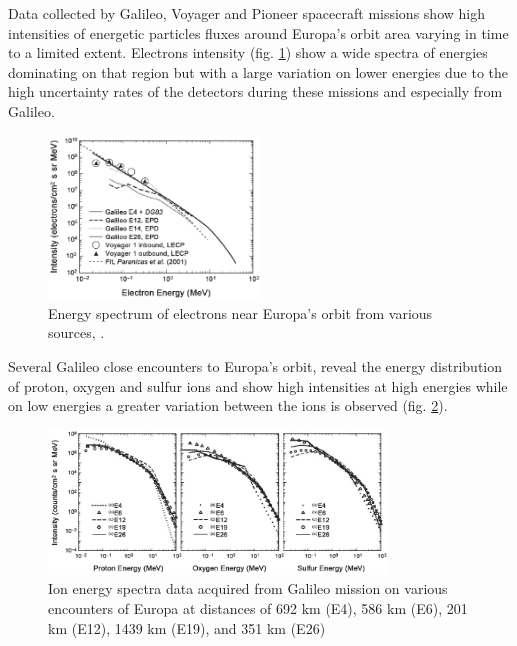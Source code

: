 Data collected by Galileo, Voyager and Pioneer spacecraft missions show high intensities of energetic particles fluxes around Europa’s orbit area varying in time to a limited extent. Electrons intensity (fig. \ref{electrons energy}) show a wide spectra of energies dominating on that region but with a large variation on lower energies due to the high uncertainty rates of the detectors during these missions and especially from Galileo.
\begin{figure}[h!]
\centering
\includegraphics[width=0.5\textwidth]{figures/Orbiter/electrons_energy_spectrum}
\caption{Energy spectrum of electrons near Europa’s orbit from various sources, \cite{paranicas2009europa}.}
\label{electrons energy}
\end{figure}
Several Galileo close encounters to Europa’s orbit, reveal the energy distribution of proton, oxygen and sulfur ions and show high intensities at high energies while on low energies a greater variation between the ions is observed (fig. \ref{fig:ions_energy}).
\begin{figure}[h!]
    \centering
    \includegraphics[width=0.80\textwidth]{figures/Orbiter/ions_energy}
    \caption{Ion energy spectra data acquired from Galileo mission on various encounters of Europa at distances of 692 km (E4), 586 km (E6), 201 km (E12), 1439 km (E19), and 351 km (E26) \cite{paranicas2009europa}}
    \label{fig:ions_energy}
\end{figure}
